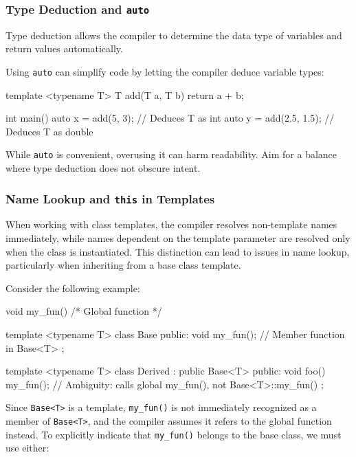 \subsubsection{Type Deduction and \texttt{auto}}

Type deduction allows the compiler to determine the data type of variables and return values automatically.

Using \texttt{auto} can simplify code by letting the compiler deduce variable types:

\begin{codeblock}[language=C++, numbers=none]
template <typename T>
T add(T a, T b) { return a + b; }

int main() {
    auto x = add(5, 3);      // Deduces T as int
    auto y = add(2.5, 1.5);  // Deduces T as double
}
\end{codeblock}

While \texttt{auto} is convenient, overusing it can harm readability. Aim for a balance where type deduction does not obscure intent.

\subsubsection{Name Lookup and \texttt{this} in Templates}

When working with class templates, the compiler resolves non-template names immediately, while names dependent on the template parameter are resolved only when the class is instantiated. This distinction can lead to issues in name lookup, particularly when inheriting from a base class template.

Consider the following example:

\begin{exampleblock}
\begin{codeblock}[language=C++, numbers=none]
void my_fun() { /* Global function */ }

template <typename T>
class Base {
public:
    void my_fun(); // Member function in Base<T>
};

template <typename T>
class Derived : public Base<T> {
public:
    void foo() {
        my_fun(); // Ambiguity: calls global my_fun(), not Base<T>::my_fun()
    }
};
\end{codeblock}
\end{exampleblock}

Since \texttt{Base<T>} is a template, \texttt{my\_fun()} is not immediately recognized as a member of \texttt{Base<T>}, and the compiler assumes it refers to the global function instead. To explicitly indicate that \texttt{my\_fun()} belongs to the base class, we must use either:

